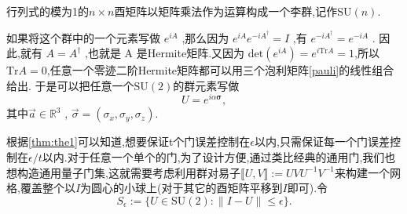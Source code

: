 \begin{definition}
	行列式的模为1的$n \times n$酉矩阵以矩阵乘法作为运算构成一个李群,记作$\mathrm{SU}(n)$.
\end{definition}

如果将这个群中的一个元素写做 $e^{iA}$ ,那么因为 $e^{iA} e^{-iA^{\dagger}}= I$ ,有 $e^{-iA^{\dagger}} = e^{-iA}$ . 因此,就有 $A = A^{\dagger}$ ,也就是 A 是Hermite矩阵.又因为 $\text{det}(e^{iA}) = e^{i\text{Tr} A} = 1 $,所以 $\text{Tr} A = 0 $,任意一个零迹二阶Hermite矩阵都可以用三个泡利矩阵\cref{pauli}的线性组合给出. 于是可以把任意一个$\mathrm{SU}(2)$的群元素写做 
\begin{equation}
	U = e^{i \alpha \boldsymbol{\sigma}},
\end{equation}
其中$\vec{a} \in \mathbb{R}^3$ , $\vec{\sigma}=\left(\sigma_x, \sigma_y, \sigma_z\right)$.

根据\cref{thm:the1}可以知道,想要保证t个门误差控制在$\epsilon$以内,只需保证每一个门误差控制在$\epsilon /t$以内.对于任意一个单个的门,为了设计方便,通过类比经典的通用门,我们也想构造通用量子门集,这就需要考虑利用群对易子$\llbracket U, V\rrbracket:=U V U^{-1} V^{-1} $来构建一个网格,覆盖整个以$I$为圆心的小球上(对于其它的酉矩阵平移到$I$即可).令
\begin{equation}
	S_\epsilon:=\{U \in \mathrm{SU}(2):\|I-U\| \leq \epsilon\}.
\end{equation}

